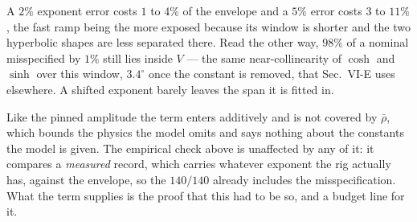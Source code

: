\documentclass[10pt]{article}
\newcommand{\rbar}{\bar\rho}
\begin{document}
A $2\%$ exponent error costs $1$ to $4\%$ of the envelope and a $5\%$
error costs $3$ to $11\%$, the fast ramp being the more exposed because
its window is shorter and the two hyperbolic shapes are less separated
there. Read the other way, $98\%$ of a nominal misspecified by $1\%$
still lies inside $V$ --- the same near-collinearity of $\cosh$ and
$\sinh$ over this window, $3.4^\circ$ once the constant is removed, that
Sec.~VI-E uses elsewhere. A shifted exponent barely leaves the span it
is fitted in.

Like the pinned amplitude the term enters additively and is not covered
by $\rbar$, which bounds the physics the model omits and says nothing
about the constants the model is given. The empirical check above is
unaffected by any of it: it compares a \emph{measured} record, which
carries whatever exponent the rig actually has, against the envelope, so
the $140/140$ already includes the misspecification. What the term
supplies is the proof that this had to be so, and a budget line for it.
\end{document}
